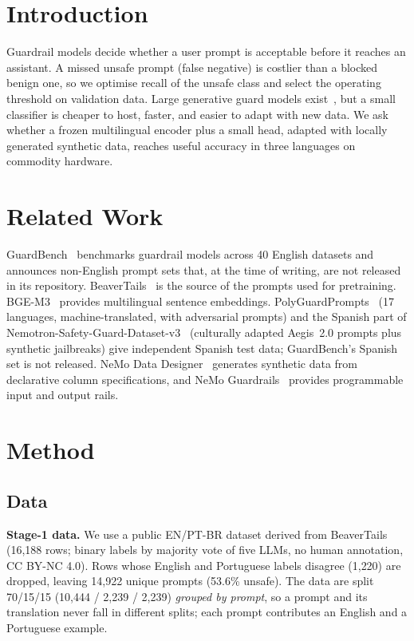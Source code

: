 \documentclass[conference]{IEEEtran}
\begin{document}
\section{Introduction}
Guardrail models decide whether a user prompt is acceptable before it reaches an assistant. A missed unsafe prompt (false negative) is costlier than a blocked benign one, so we optimise recall of the unsafe class and select the operating threshold on validation data. Large generative guard models exist~\cite{nvidia2025nemotronsafety}, but a small classifier is cheaper to host, faster, and easier to adapt with new data. We ask whether a frozen multilingual encoder plus a small head, adapted with locally generated synthetic data, reaches useful accuracy in three languages on commodity hardware.

\section{Related Work}
GuardBench~\cite{bassani2024guardbench} benchmarks guardrail models across 40 English datasets and announces non-English prompt sets that, at the time of writing, are not released in its repository. BeaverTails~\cite{ji2023beavertails} is the source of the prompts used for pretraining. BGE-M3~\cite{chen2024bgem3} provides multilingual sentence embeddings. PolyGuardPrompts~\cite{polyguard2025} (17 languages, machine-translated, with adversarial prompts) and the Spanish part of Nemotron-Safety-Guard-Dataset-v3~\cite{nemotronv3} (culturally adapted Aegis~2.0 prompts plus synthetic jailbreaks) give independent Spanish test data; GuardBench's Spanish set is not released. NeMo Data Designer~\cite{nvidia2026dd} generates synthetic data from declarative column specifications, and NeMo Guardrails~\cite{rebedea2023nemoguardrails} provides programmable input and output rails.

\section{Method}
\subsection{Data}
\textbf{Stage-1 data.} We use a public EN/PT-BR dataset derived from BeaverTails (16{,}188 rows; binary labels by majority vote of five LLMs, no human annotation, CC BY-NC 4.0). Rows whose English and Portuguese labels disagree (1{,}220) are dropped, leaving 14{,}922 unique prompts (53.6\% unsafe). The data are split 70/15/15 (10{,}444 / 2{,}239 / 2{,}239) \emph{grouped by prompt}, so a prompt and its translation never fall in different splits; each prompt contributes an English and a Portuguese example.
\end{document}

